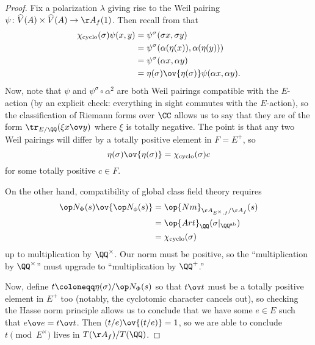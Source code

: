 \documentclass[../notes.tex]{subfiles}
\begin{document}
\begin{proof}
	Fix a polarization $\lambda$ giving rise to the Weil pairing $\psi\colon\widehat V(A)\times\widehat V(A)\to\AA_f(1)$. Then recall from  that
	\begin{align*}
		\chi_{\mathrm{cyclo}}(\sigma)\psi(x,y) &= \psi^\sigma(\sigma x,\sigma y) \\
		&= \psi^\sigma(\alpha(\eta(x)),\alpha(\eta(y))) \\
		&= \psi^\sigma(\alpha x,\alpha y) \\
		&= \eta(\sigma)\ov{\eta(\sigma)}\psi(\alpha x,\alpha y).
	\end{align*}
	Now, note that $\psi$ and $\psi^\sigma\circ\alpha^2$ are both Weil pairings compatible with the $E$-action (by an explicit check: everything in sight commutes with the $E$-action), so the classification of Riemann forms over $\CC$ allows us to say that they are of the form $\tr_{E/\QQ}(\xi x\ov y)$ where $\xi$ is totally negative. The point is that any two Weil pairings will differ by a totally positive element in $F=E^+$, so
	\[\eta(\sigma)\ov{\eta(\sigma)}=\chi_{\mathrm{cyclo}}(\sigma)c\]
	for some totally positive $c\in F$.

	On the other hand, compatibility of global class field theory requires
	\begin{align*}
		\op N_\Phi(s)\ov{\op N_\phi(s)} &= \op{Nm}_{\AA_{E^\times,f}/\AA_f}(s) \\
		&= \op{Art}_\QQ(\sigma|_{\QQ^{\mathrm{ab}}}) \\
		&= \chi_{\mathrm{cyclo}}(\sigma)
	\end{align*}
	up to multiplication by $\QQ^\times$. Our norm must be positive, so the ``multiplication by $\QQ^\times$'' must upgrade to ``multiplication by $\QQ^+$.''

	Now, define $t\coloneqq\eta(\sigma)/\op N_\Phi(s)$ so that $t\ov t$ must be a totally positive element in $E^+$ too (notably, the cyclotomic character cancels out), so checking the Hasse norm principle allows us to conclude that we have some $e\in E$ such that $e\ov e=t\ov t$. Then $(t/e)\ov{(t/e)}=1$, so we are able to conclude $t\pmod{E^\times}$ lives in $T(\AA_f)/T(\QQ)$.
\end{proof}
\end{document}
